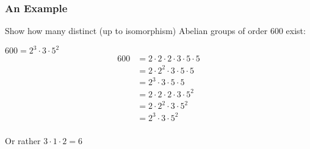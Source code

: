 \documentclass{article}
\begin{document}
  \subsubsection{An Example}

  Show how many distinct (up to isomorphism) Abelian groups of order 600 exist:

  $600 = 2^3 \cdot 3 \cdot 5^2$ \\
  \begin{align*}
    600 & = 2 \cdot 2 \cdot 2\cdot 3 \cdot 5 \cdot 5  \\
        & = 2 \cdot 2^2 \cdot 3 \cdot 5 \cdot 5       \\
        & = 2^3 \cdot 3 \cdot 5 \cdot 5               \\
        & = 2 \cdot 2 \cdot 2\cdot 3 \cdot 5^2        \\
        & = 2 \cdot 2^2 \cdot 3 \cdot 5^2             \\
        & = 2^3 \cdot 3 \cdot 5^2                     \\
  \end{align*}

  Or rather $3 \cdot 1 \cdot 2 = 6$
\end{document}
